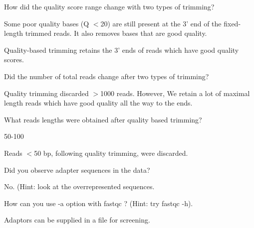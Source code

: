 \begin{questions}
How did the quality score range change with two types of trimming?
\begin{answer}
Some poor quality bases (Q $<$20) are still present at the 3' end of the
fixed-length trimmed reads. It also removes bases that are good quality.

Quality-based trimming retains the 3' ends of reads which have good quality
scores.
\end{answer}

Did the number of total reads change after two types of trimming?
\begin{answer}
Quality trimming discarded $>$1000 reads. However, We retain a lot of maximal
length reads which have good quality all the way to the ends.
\end{answer}

What reads lengths were obtained after quality based trimming?
\begin{answer}
50-100

Reads $<$50 bp, following quality trimming, were discarded.
\end{answer}

Did you observe adapter sequences in the data?
\begin{answer}
No. (Hint: look at the overrepresented sequences.
\end{answer}

How can you use -a option with fastqc ? (Hint: try fastqc -h).
\begin{answer}
Adaptors can be supplied in a file for screening.
\end{answer}
\end{questions}


